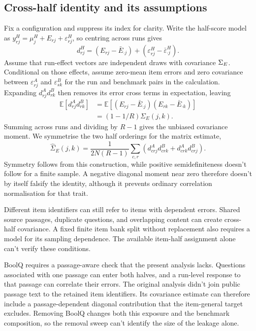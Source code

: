 \subsection{Cross-half identity and its assumptions}
Fix a configuration and suppress its index for clarity. Write the half-score model as $y^H_{rj}=\mu^H_j+E_{rj}+\varepsilon^H_{rj}$, so centring across runs gives
\begin{equation}
d^H_{rj}=(E_{rj}-\bar E_{\cdot j})+(\varepsilon^H_{rj}-\bar\varepsilon^H_{\cdot j}).
\end{equation}
Assume that run-effect vectors are independent draws with covariance $\Sigma_E$. Conditional on those effects, assume zero-mean item errors and zero covariance between $\varepsilon^A_{rj}$ and $\varepsilon^B_{sk}$ for the run and benchmark pairs in the calculation. Expanding $d^A_{rj}d^B_{rk}$ then removes its error cross terms in expectation, leaving
\begin{align}
\mathbb E[d^A_{rj}d^B_{rk}]
&=\mathbb E[(E_{rj}-\bar E_{\cdot j})(E_{rk}-\bar E_{\cdot k})]\\
&=(1-1/R)\Sigma_E(j,k).
\end{align}
Summing across runs and dividing by $R-1$ gives the unbiased covariance moment. We symmetrise the two half orderings for the matrix estimate,
\begin{equation}
\widehat\Sigma_E(j,k)=\frac{1}{2N(R-1)}\sum_{c,r}
\left(d^A_{crj}d^B_{crk}+d^A_{crk}d^B_{crj}\right).
\end{equation}
Symmetry follows from this construction, while positive semidefiniteness doesn't follow for a finite sample. A negative diagonal moment near zero therefore doesn't by itself falsify the identity, although it prevents ordinary correlation normalisation for that trait.

Different item identifiers can still refer to items with dependent errors. Shared source passages, duplicate questions, and overlapping content can create cross-half covariance. A fixed finite item bank split without replacement also requires a model for its sampling dependence. The available item-half assignment alone can't verify these conditions.

BoolQ requires a passage-aware check that the present analysis lacks. Questions associated with one passage can enter both halves, and a run-level response to that passage can correlate their errors. The original analysis didn't join public passage text to the retained item identifiers. Its covariance estimate can therefore include a passage-dependent diagonal contribution that the item-general target excludes. Removing BoolQ changes both this exposure and the benchmark composition, so the removal sweep can't identify the size of the leakage alone.

